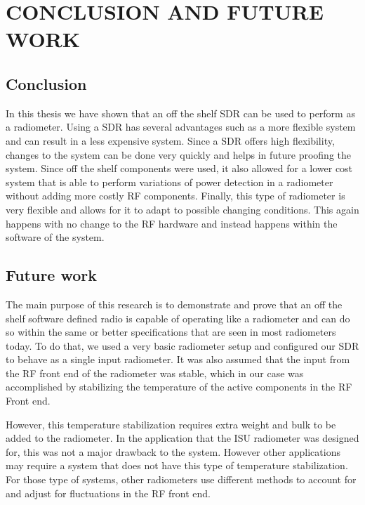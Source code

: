 
\chapter{CONCLUSION AND FUTURE WORK} \label{ch:conclusion}

\section{Conclusion}
In this thesis we have shown that an off the shelf SDR can be used to perform as a radiometer.  Using a SDR has several advantages such as a more flexible system and can result in a less expensive system.  Since a SDR offers high flexibility, changes to the system can be done very quickly and helps in future proofing the system.  Since off the shelf components were used, it also allowed for a lower cost system that is able to perform variations of power detection in a radiometer without adding more costly RF components.  Finally, this type of radiometer is very flexible and allows for it to adapt to possible changing conditions.  This again happens with no change to the RF hardware and instead happens within the software of the system.

\section{Future work}
The main purpose of this research is to demonstrate and prove that an off the shelf software defined radio is capable of operating like a radiometer and can do so within the same or better specifications that are seen in most radiometers today.  To do that, we used a very basic radiometer setup and configured our SDR to behave as a single input radiometer.  It was also assumed that the input from the RF front end of the radiometer was stable, which in our case was accomplished by stabilizing the temperature of the active components in the RF Front end.

However, this temperature stabilization requires extra weight and bulk to be added to the radiometer.  In the application that the ISU radiometer was designed for, this was not a major drawback to the system.  However other applications may require a system that does not have this type of temperature stabilization.  For those type of systems, other radiometers use different methods to account for and adjust for fluctuations in the RF front end. 

